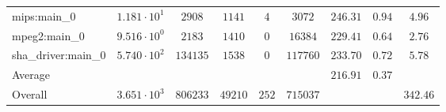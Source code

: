 \begin{tabular}{|l|c|c|c|c|c|c|c|c|}
mips:main\_0            & $ 1.181 \cdot 10^{1}  $ & $ 2908   $ & $ 1141  $ & $ 4   $ & $ 3072   $ & $ 246.31      $ & $ 0.94    $ & $ 4.96    $ \\
mpeg2:main\_0           & $ 9.516 \cdot 10^{0}  $ & $ 2183   $ & $ 1410  $ & $ 0   $ & $ 16384  $ & $ 229.41      $ & $ 0.64    $ & $ 2.76    $ \\
sha\_driver:main\_0     & $ 5.740 \cdot 10^{2}  $ & $ 134135 $ & $ 1538  $ & $ 0   $ & $ 117760 $ & $ 233.70      $ & $ 0.72    $ & $ 5.78    $ \\
\hline
Average                 & $                     $ & $        $ & $       $ & $     $ & $        $ & $ 216.91      $ & $ 0.37    $ & $         $ \\
\hline
Overall                 & $ 3.651 \cdot 10^{3}  $ & $ 806233 $ & $ 49210 $ & $ 252 $ & $ 715037 $ & $             $ & $         $ & $ 342.46  $ \\
\hline
\end{tabular}
